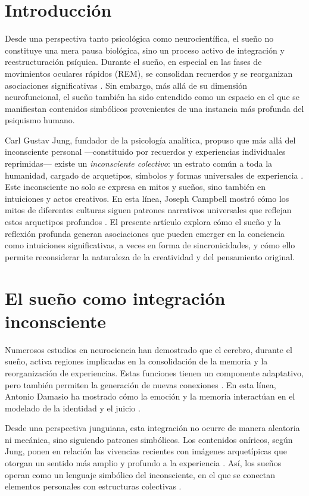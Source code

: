 \section*{Introducción}

Desde una perspectiva tanto psicológica como neurocientífica, el sueño no constituye una mera pausa biológica, sino un proceso activo de integración y reestructuración psíquica. Durante el sueño, en especial en las fases de movimientos oculares rápidos (REM), se consolidan recuerdos y se reorganizan asociaciones significativas \cite{damasio1999,eagleman2011}. Sin embargo, más allá de su dimensión neurofuncional, el sueño también ha sido entendido como un espacio en el que se manifiestan contenidos simbólicos provenientes de una instancia más profunda del psiquismo humano.

Carl Gustav Jung, fundador de la psicología analítica, propuso que más allá del inconsciente personal —constituido por recuerdos y experiencias individuales reprimidas— existe un \textit{inconsciente colectivo}: un estrato común a toda la humanidad, cargado de arquetipos, símbolos y formas universales de experiencia \cite{jung1959}. Este inconsciente no solo se expresa en mitos y sueños, sino también en intuiciones y actos creativos. En esta línea, Joseph Campbell mostró cómo los mitos de diferentes culturas siguen patrones narrativos universales que reflejan estos arquetipos profundos \cite{campbell1949}. El presente artículo explora cómo el sueño y la reflexión profunda generan asociaciones que pueden emerger en la conciencia como intuiciones significativas, a veces en forma de sincronicidades, y cómo ello permite reconsiderar la naturaleza de la creatividad y del pensamiento original.

\section*{El sueño como integración inconsciente}

Numerosos estudios en neurociencia han demostrado que el cerebro, durante el sueño, activa regiones implicadas en la consolidación de la memoria y la reorganización de experiencias. Estas funciones tienen un componente adaptativo, pero también permiten la generación de nuevas conexiones \cite{damasio1999,eagleman2011}. En esta línea, Antonio Damasio ha mostrado cómo la emoción y la memoria interactúan en el modelado de la identidad y el juicio \cite{damasio1999}.

Desde una perspectiva junguiana, esta integración no ocurre de manera aleatoria ni mecánica, sino siguiendo patrones simbólicos. Los contenidos oníricos, según Jung, ponen en relación las vivencias recientes con imágenes arquetípicas que otorgan un sentido más amplio y profundo a la experiencia \cite{jung1959}. Así, los sueños operan como un lenguaje simbólico del inconsciente, en el que se conectan elementos personales con estructuras colectivas \cite{jung1959,jung1964}.


